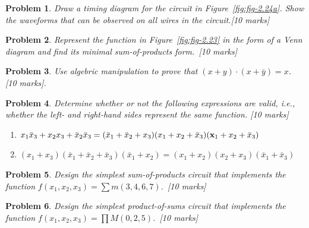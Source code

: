 \documentclass[twocolumn]{article}
\newtheorem{prob}{Problem}
\newcommand{\bx}{\bar{x}}
\begin{document}
\begin{prob}
Draw a timing diagram for the circuit in Figure~\ref{fig:fig-2.24a}. Show the waveforms that can be observed on all wires in the circuit.\cite[Prob 2.8]{brown2013fundamentals}[10 marks]
\end{prob}

\begin{prob}
Represent the function in Figure~\ref{fig:fig-2.23} in the form of a Venn diagram and find its minimal
sum-of-products form.~\cite[Prob 2.17]{brown2013fundamentals}[10 marks]
\end{prob}

\begin{prob}
Use algebric manipulation to prove that $(x+y)\cdot(x+\bar{y}) = x$. \cite[Prob 2.2]{brown2013fundamentals} [10 marks].
\end{prob}

\begin{prob}
Determine whether or not the following expressions are valid, i.e., whether the left- and
right-hand sides represent the same function.
\cite[Prob 2.7]{brown2013fundamentals}[10 marks]
\begin{enumerate}
    \item $x_1 \bx_3 + x_2 x_3 + \bx_2 \bx_3 = (\bx_1 + \bx_2 + x_3)(x_1 + x_2 + \bx_3)(\bfx_1 + x_2 + \bx_3)$
    \item $(x_1 + x_3)(\bx_1 + \bx_2 + \bx_3)(\bx_1 + x_2) = (x_1 + x_2)(x_2 + x_3)(\bx_1 + \bx_3)$
\end{enumerate}
\end{prob}

\begin{prob}
Design the simplest sum-of-products circuit that implements the function $f (x_1 , x_2 , x_3 ) = \sum m(3, 4, 6, 7)$.~\cite[Prob 2.21]{brown2013fundamentals}[10 marks]
\end{prob}

\begin{prob}
Design the simplest product-of-sums circuit that implements the function $f (x_1 , x_2 , x_3 ) = \prod M (0, 2, 5)$.~\cite[Prob 2.22]{brown2013fundamentals}[10 marks]
\end{prob}




\end{document}
